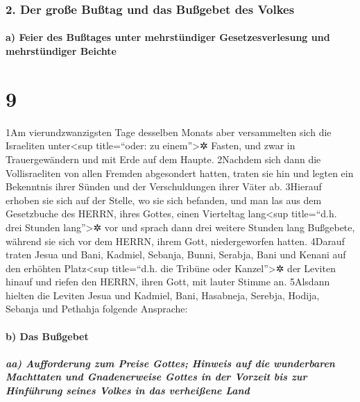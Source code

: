 \hypertarget{der-grouxdfe-buuxdftag-und-das-buuxdfgebet-des-volkes}{%
\subsubsection{2. Der große Bußtag und das Bußgebet des
Volkes}\label{der-grouxdfe-buuxdftag-und-das-buuxdfgebet-des-volkes}}

\hypertarget{a-feier-des-buuxdftages-unter-mehrstuxfcndiger-gesetzesverlesung-und-mehrstuxfcndiger-beichte}{%
\paragraph{a) Feier des Bußtages unter mehrstündiger Gesetzesverlesung
und mehrstündiger
Beichte}\label{a-feier-des-buuxdftages-unter-mehrstuxfcndiger-gesetzesverlesung-und-mehrstuxfcndiger-beichte}}

\hypertarget{section-8}{%
\section{9}\label{section-8}}

1Am vierundzwanzigsten Tage desselben Monats aber versammelten sich die
Israeliten unter\textless sup title=``oder: zu einem''\textgreater✲
Fasten, und zwar in Trauergewändern und mit Erde auf dem Haupte.
2Nachdem sich dann die Vollisraeliten von allen Fremden abgesondert
hatten, traten sie hin und legten ein Bekenntnis ihrer Sünden und der
Verschuldungen ihrer Väter ab. 3Hierauf erhoben sie sich auf der Stelle,
wo sie sich befanden, und man las aus dem Gesetzbuche des HERRN, ihres
Gottes, einen Vierteltag lang\textless sup title=``d.h. drei Stunden
lang''\textgreater✲ vor und sprach dann drei weitere Stunden lang
Bußgebete, während sie sich vor dem HERRN, ihrem Gott, niedergeworfen
hatten. 4Darauf traten Jesua und Bani, Kadmiel, Sebanja, Bunni, Serabja,
Bani und Kenani auf den erhöhten Platz\textless sup title=``d.h. die
Tribüne oder Kanzel''\textgreater✲ der Leviten hinauf und riefen den
HERRN, ihren Gott, mit lauter Stimme an. 5Alsdann hielten die Leviten
Jesua und Kadmiel, Bani, Hasabneja, Serebja, Hodija, Sebanja und
Pethahja folgende Ansprache:

\hypertarget{b-das-buuxdfgebet}{%
\paragraph{b) Das Bußgebet}\label{b-das-buuxdfgebet}}

\hypertarget{aa-aufforderung-zum-preise-gottes-hinweis-auf-die-wunderbaren-machttaten-und-gnadenerweise-gottes-in-der-vorzeit-bis-zur-hinfuxfchrung-seines-volkes-in-das-verheiuxdfene-land}{%
\subparagraph{aa) Aufforderung zum Preise Gottes; Hinweis auf die
wunderbaren Machttaten und Gnadenerweise Gottes in der Vorzeit bis zur
Hinführung seines Volkes in das verheißene
Land}\label{aa-aufforderung-zum-preise-gottes-hinweis-auf-die-wunderbaren-machttaten-und-gnadenerweise-gottes-in-der-vorzeit-bis-zur-hinfuxfchrung-seines-volkes-in-das-verheiuxdfene-land}}

